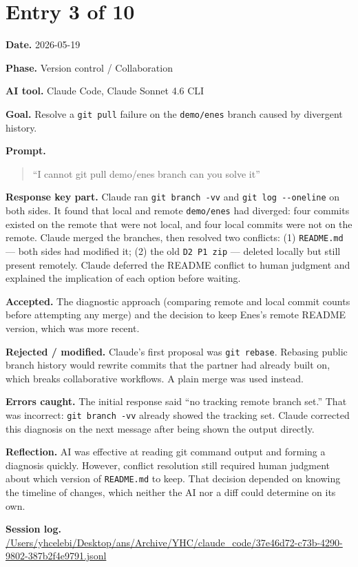 \documentclass[11pt,a4paper]{article}
\newcommand{\code}[1]{\texttt{#1}}
\newcommand{\field}[2]{\textbf{#1.} #2\par}
\newcommand{\prompt}[1]{%
  \textbf{Prompt.}
  \begin{quote}\small #1\end{quote}
}
\newcommand{\sessionlog}[1]{\textbf{Session log.} \url{#1}\par}
\begin{document}
\section{Entry 3 of 10}
\field{Date}{2026-05-19}
\field{Phase}{Version control / Collaboration}
\field{AI tool}{Claude Code, Claude Sonnet 4.6 CLI}
\field{Goal}{Resolve a \code{git pull} failure on the \code{demo/enes} branch caused by divergent history.}
\prompt{``I cannot git pull demo/enes branch can you solve it''}
\field{Response key part}{Claude ran \code{git branch -vv} and \code{git log -{}-oneline} on both sides. It found that local and remote \texttt{demo/enes} had diverged: four commits existed on the remote that were not local, and four local commits were not on the remote. Claude merged the branches, then resolved two conflicts: (1) \texttt{README.md} --- both sides had modified it; (2) the old \texttt{D2 P1 zip} --- deleted locally but still present remotely. Claude deferred the README conflict to human judgment and explained the implication of each option before waiting.}
\field{Accepted}{The diagnostic approach (comparing remote and local commit counts before attempting any merge) and the decision to keep Enes's remote README version, which was more recent.}
\field{Rejected / modified}{Claude's first proposal was \code{git rebase}. Rebasing public branch history would rewrite commits that the partner had already built on, which breaks collaborative workflows. A plain merge was used instead.}
\field{Errors caught}{The initial response said ``no tracking remote branch set.'' That was incorrect: \code{git branch -vv} already showed the tracking set. Claude corrected this diagnosis on the next message after being shown the output directly.}
\field{Reflection}{AI was effective at reading git command output and forming a diagnosis quickly. However, conflict resolution still required human judgment about which version of \texttt{README.md} to keep. That decision depended on knowing the timeline of changes, which neither the AI nor a diff could determine on its own.}
\sessionlog{/Users/yhcelebi/Desktop/ans/Archive/YHC/claude_code/37e46d72-c73b-4290-9802-387b2f4e9791.jsonl}

\end{document}
